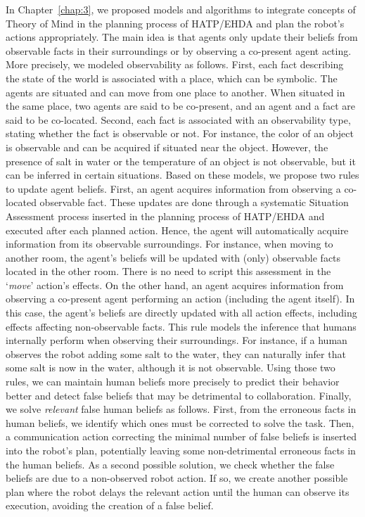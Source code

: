 In Chapter~\ref{chap:3}, we proposed models and algorithms to integrate concepts of Theory of Mind in the planning process of HATP/EHDA and plan the robot's actions appropriately. 
The main idea is that agents only update their beliefs from observable facts in their surroundings or by observing a co-present agent acting. 
More precisely, we modeled observability as follows. First, each fact describing the state of the world is associated with a place, which can be symbolic. The agents are situated and can move from one place to another. When situated in the same place, two agents are said to be co-present, and an agent and a fact are said to be co-located. Second, each fact is associated with an observability type, stating whether the fact is observable or not. For instance, the color of an object is observable and can be acquired if situated near the object. However, the presence of salt in water or the temperature of an object is not observable, but it can be inferred in certain situations.
Based on these models, we propose two rules to update agent beliefs. First, an agent acquires information from observing a co-located observable fact. These updates are done through a systematic Situation Assessment process inserted in the planning process of HATP/EHDA and executed after each planned action. Hence, the agent will automatically acquire information from its observable surroundings. For instance, when moving to another room, the agent's beliefs will be updated with (only) observable facts located in the other room.  There is no need to script this assessment in the `\textit{move}' action's effects. On the other hand, an agent acquires information from observing a co-present agent performing an action (including the agent itself). In this case, the agent's beliefs are directly updated with all action effects, including effects affecting non-observable facts. This rule models the inference that humans internally perform when observing their surroundings. For instance, if a human observes the robot adding some salt to the water, they can naturally infer that some salt is now in the water, although it is not observable.
Using those two rules, we can maintain human beliefs more precisely to predict their behavior better and detect false beliefs that may be detrimental to collaboration. Finally, we solve \textit{relevant} false human beliefs as follows. First, from the erroneous facts in human beliefs, we identify which ones must be corrected to solve the task. Then, a communication action correcting the minimal number of false beliefs is inserted into the robot's plan, potentially leaving some non-detrimental erroneous facts in the human beliefs. As a second possible solution, we check whether the false beliefs are due to a non-observed robot action. If so, we create another possible plan where the robot delays the relevant action until the human can observe its execution, avoiding the creation of a false belief. 
